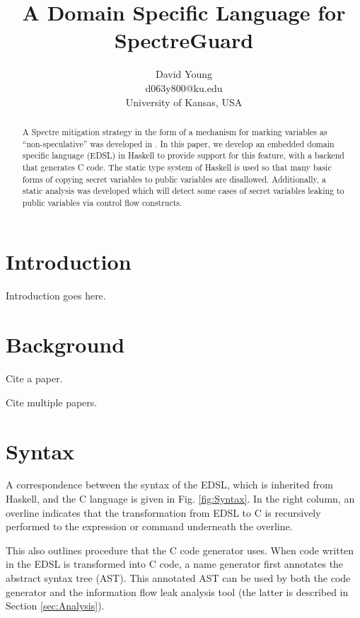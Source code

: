 \documentclass[10pt, conference]{IEEEtran}
\begin{document}
\title{A Domain Specific Language for SpectreGuard}
\author{David Young\\
d063y800@ku.edu\\
University of Kansas, USA\\
}

\maketitle
\thispagestyle{empty}
\begin{abstract}

  A Spectre mitigation strategy in the form of a mechanism for marking variables
  as ``non-speculative'' was developed in \cite{SpectreGuard}. In this paper, we
  develop an embedded domain specific language (EDSL) in Haskell to provide
  support for this feature, with a backend that generates C code. The static
  type system of Haskell is used so that many basic forms of copying secret
  variables to public variables are disallowed. Additionally, a static analysis
  was developed which will detect some cases of secret variables leaking to
  public variables via control flow constructs.

\end{abstract}


\section{Introduction}
Introduction goes here.

\section{Background}
Cite a paper. %

Cite multiple papers. %

\section{Syntax}
A correspondence between the syntax of the EDSL, which is inherited from
Haskell, and the C language is given in Fig. \ref{fig:Syntax}. In the right column, an
overline indicates that the transformation from EDSL to C is recursively
performed to the expression or command underneath the overline.

This also outlines procedure that the C code generator uses. When code written
in the EDSL is transformed into C code, a name generator first annotates the abstract syntax tree
(AST). This annotated AST can be used by both the code generator and the information flow
leak analysis tool (the latter is described in Section \ref{sec:Analysis}).
\end{document}
